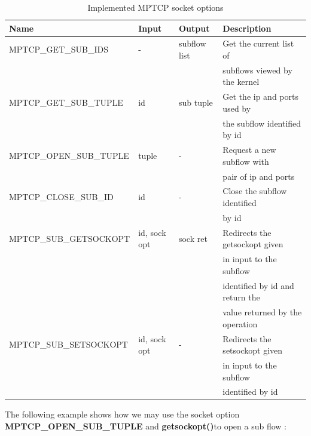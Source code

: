 \documentclass[a4paper,11pt]{article}
\begin{document}
			\begin{table}[h]
				
				

				\begin{tabular}{l|l|l|l}
					\hline
					Name & Input & Output & Description \\
					\hline
					\hline
					MPTCP\_GET\_SUB\_IDS & - & subflow list & Get the current list of \\&&&subflows viewed by the kernel \\
					\hline
					MPTCP\_GET\_SUB\_TUPLE & id & sub tuple & Get the ip and ports used by \\&&&the subflow identified by id \\
					\hline
					MPTCP\_OPEN\_SUB\_TUPLE & tuple & - & Request a new subflow with \\&&&pair of ip and ports \\
					\hline
					MPTCP\_CLOSE\_SUB\_ID & id & - & Close the subflow identified \\&&&by id \\
					\hline
					MPTCP\_SUB\_GETSOCKOPT & id, sock opt & sock ret & Redirects the getsockopt given \\&&&in input to the subflow \\&&&identified by id and return the \\&&&value returned by the operation \\
					\hline
					MPTCP\_SUB\_SETSOCKOPT & id, sock opt & - & Redirects the setsockopt given \\&&&in input to the subflow \\&&&identified by id \\
					\hline

				\end{tabular}
				\caption{Implemented MPTCP socket options}
			\end{table}

			\raggedright{The following example shows how we may use the socket option \textbf{MPTCP\_OPEN\_SUB\_TUPLE} and \textbf{getsockopt()}to open a sub flow \cite{api}:}
\end{document}
